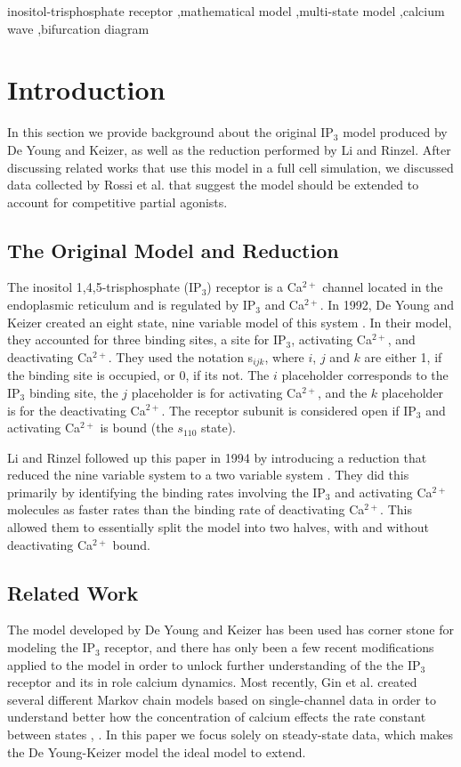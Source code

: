 \documentclass[preprint,12pt]{elsarticle}
\begin{document}
\begin{frontmatter}
\begin{keyword}

inositol-trisphosphate receptor \sep mathematical model \sep multi-state model \sep calcium wave \sep bifurcation diagram

\end{keyword}

\end{frontmatter}

\section{Introduction}
In this section we provide background about the original IP$_3$ model produced by De Young and Keizer, as well as the reduction performed by Li and Rinzel. After discussing related works that use this model in a full cell simulation, we discussed data collected by Rossi et al. that suggest the model should be extended to account for competitive partial agonists.
\subsection{The Original Model and Reduction}
The inositol 1,4,5-trisphosphate (IP$_3$) receptor is a Ca$^{2+}$ channel located in the endoplasmic reticulum and is regulated by IP$_3$ and Ca$^{2+}$. In 1992, De Young and Keizer created an eight state, nine variable model of this system \cite{young}. In their model, they accounted for three binding sites, a site for IP$_3$, activating Ca$^{2+}$, and deactivating Ca$^{2+}$. They used the notation s$_{ijk}$, where $i$, $j$ and $k$ are either 1, if the binding site is occupied, or 0, if its not. The $i$ placeholder corresponds to the IP$_3$ binding site, the $j$ placeholder is for activating Ca$^{2+}$, and the $k$ placeholder is for the deactivating Ca$^{2+}$. The receptor subunit is considered open if IP$_3$ and activating Ca$^{2+}$  is bound (the $s_{110}$ state). 

Li and Rinzel followed up this paper in 1994 by introducing a reduction that reduced the nine variable system to a two variable system \cite{li}. They did this primarily by identifying the binding rates involving the IP$_3$ and activating Ca$^{2+}$  molecules as faster rates than the binding rate of deactivating Ca$^{2+}$. This allowed them to essentially split the model into two halves, with and without deactivating Ca$^{2+}$ bound. 

\subsection{Related Work}
The model developed by De Young and Keizer has been used has corner stone for modeling the IP$_3$ receptor, and there has only been a few recent modifications applied to the model in order to unlock further understanding of the the IP$_3$ receptor and its in role calcium dynamics. Most recently, Gin et al. created several different Markov chain models based on single-channel data in order to understand better how the concentration of calcium effects the rate constant between states \cite{single1}, \cite{single2}. In this paper we focus solely on steady-state data, which makes the De Young-Keizer model the ideal model to extend.
\end{document}
